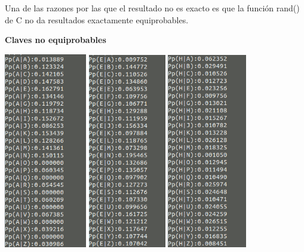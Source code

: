 \documentclass{apuntes}
\begin{document}
Una de las razones por las que el resultado no es exacto es que la función rand() de C no da resultados exactamente equiprobables.

\textbf{Claves no equiprobables}

\begin{center}
	\includegraphics[width=102pt]{ProbANE.png}
	\includegraphics[width=96pt]{ProbENE.png}
	\includegraphics[width=98pt]{ProbHNE.png}
\end{center}
\end{document}

